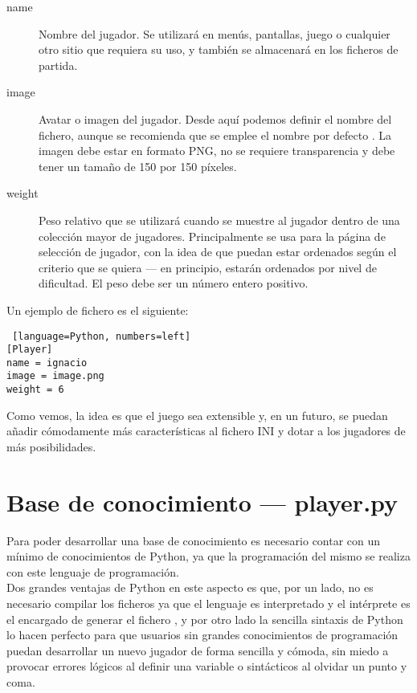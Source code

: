 \begin{description}
    \item[name] Nombre del jugador. Se utilizará en menús, pantallas, juego o cualquier otro sitio que requiera su uso,
        y también se almacenará en los ficheros de partida.
    \item[image] Avatar o imagen del jugador. Desde aquí podemos definir el nombre del fichero, aunque se recomienda que
        se emplee el nombre por defecto . La imagen debe estar en formato PNG, no se requiere transparencia
        y debe tener un tamaño de 150 por 150 píxeles.
    \item[weight] Peso relativo que se utilizará cuando se muestre al jugador dentro de una colección mayor de jugadores.
        Principalmente se usa para la página de selección de jugador, con la idea de que puedan estar ordenados según
        el criterio que se quiera --- en principio, estarán ordenados por nivel de dificultad. El peso debe ser un número
        entero positivo.
\end{description}

Un ejemplo de fichero es el siguiente:

\begin{lstlisting} [language=Python, numbers=left]
[Player]
name = ignacio
image = image.png
weight = 6
\end{lstlisting}

Como vemos, la idea es que el juego sea extensible y, en un futuro, se puedan añadir cómodamente más características
al fichero INI y dotar a los jugadores de más posibilidades.


\section{Base de conocimiento --- player.py}

Para poder desarrollar una base de conocimiento es necesario contar con un mínimo de conocimientos de Python, ya que
la programación del mismo se realiza con este lenguaje de programación. \\

Dos grandes ventajas de Python en este aspecto
es que, por un lado, no es necesario compilar los ficheros  ya que el lenguaje es interpretado y
el intérprete es el encargado de generar el fichero , y por otro lado la sencilla sintaxis de Python
lo hacen perfecto para que usuarios sin grandes conocimientos de programación puedan desarrollar un nuevo jugador
de forma sencilla y cómoda, sin miedo a provocar errores lógicos al definir una variable o sintácticos al olvidar
un punto y coma. \\

